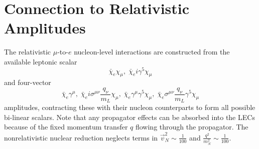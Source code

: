 \documentclass{book}[letterpaper,12pt]
\begin{document}
\section{Connection to Relativistic Amplitudes}
The relativistic $\mu$-to-$e$ nucleon-level interactions are constructed from the available leptonic scalar
\begin{equation}
\bar{\chi}_e\chi_{\mu},\;\bar{\chi}_ei\gamma^5\chi_{\mu}
\end{equation}
and four-vector
\begin{equation}
\bar{\chi}_e\gamma^{\mu},\;\bar{\chi}_ei\sigma^{\mu\nu}\frac{q_{\nu}}{m_L}\chi_{\mu},\;\bar{\chi}_e\gamma^{\mu}\gamma^5\chi_{\mu},\;\bar{\chi}_e\sigma^{\mu\nu}\frac{q_{\nu}}{m_L}\gamma^5\chi_{\mu}
\end{equation}
amplitudes, contracting these with their nucleon counterparts to form all possible bi-linear scalars. Note that any propagator effects can be absorbed into the LECs because of the fixed momentum transfer $q$ flowing through the propagator. The nonrelativistic nuclear reduction neglects terms in $\vec{v}_N^2\sim\frac{1}{100}$ and $\frac{q^2}{m_N^2}\sim\frac{1}{100}$.
\end{document}
